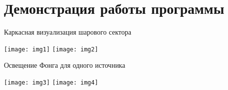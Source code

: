 \graphicspath{{png/}}

\section{Демонстрация работы программы}
Каркасная визуализация шарового сектора

\texttt{[image: img1]}
\texttt{[image: img2]}

Освещение Фонга для одного источника

\texttt{[image: img3]}
\texttt{[image: img4]}
\pagebreak
